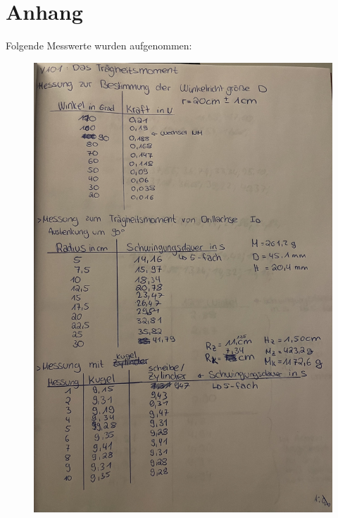 \newpage
\section*{Anhang}
Folgende Messwerte wurden aufgenommen:
\begin{figure}[H]
  \centering
  \includegraphics[width=\textwidth]{Messwerte/IMG_7710}
\end{figure}
